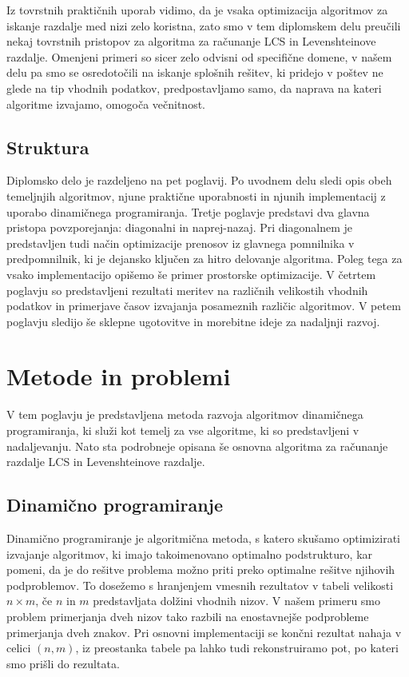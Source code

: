 \documentclass[a4paper,12pt,openright]{book}
\begin{document}
Iz tovrstnih praktičnih uporab vidimo, da je vsaka optimizacija algoritmov za iskanje razdalje med nizi zelo koristna, zato smo v tem diplomskem delu preučili nekaj tovrstnih pristopov za algoritma za računanje LCS in Levenshteinove razdalje. Omenjeni primeri so sicer zelo odvisni od specifične domene, v našem delu pa smo se osredotočili na iskanje splošnih rešitev, ki pridejo v poštev ne glede na tip vhodnih podatkov, predpostavljamo samo, da naprava na kateri algoritme izvajamo, omogoča večnitnost. 

\section{Struktura}

Diplomsko delo je razdeljeno na pet poglavij. Po uvodnem delu sledi opis obeh temeljnjih algoritmov, njune praktične uporabnosti in njunih implementacij z uporabo dinamičnega programiranja. Tretje poglavje predstavi dva glavna pristopa povzporejanja: diagonalni in naprej-nazaj. Pri diagonalnem je predstavljen tudi način optimizacije prenosov iz glavnega pomnilnika v predpomnilnik, ki je dejansko ključen za hitro delovanje algoritma. Poleg tega za vsako implementacijo opišemo še primer prostorske optimizacije. V četrtem poglavju so predstavljeni rezultati meritev na različnih velikostih vhodnih podatkov in primerjave časov izvajanja posameznih različic algoritmov. V petem poglavju sledijo še sklepne ugotovitve in morebitne ideje za nadaljnji razvoj. 

\chapter{Metode in problemi}

V tem poglavju je predstavljena metoda razvoja algoritmov dinamičnega programiranja, ki služi kot temelj za vse algoritme, ki so predstavljeni v nadaljevanju. Nato sta podrobneje opisana še osnovna algoritma za računanje razdalje LCS in Levenshteinove razdalje. 

\section{Dinamično programiranje}

Dinamično programiranje je algoritmična metoda, s katero skušamo optimizirati izvajanje algoritmov, ki imajo takoimenovano optimalno podstrukturo, kar pomeni, da je do rešitve problema možno priti preko optimalne rešitve njihovih podproblemov. To dosežemo s hranjenjem vmesnih rezultatov v tabeli velikosti $n \times m$, če $n$ in $m$ predstavljata dolžini vhodnih nizov. V našem primeru smo problem primerjanja dveh nizov tako razbili na enostavnejše podprobleme primerjanja dveh znakov. Pri osnovni implementaciji se končni rezultat nahaja v celici $(n,m)$, iz preostanka tabele pa lahko tudi rekonstruiramo pot, po kateri smo prišli do rezultata. 
\end{document}
